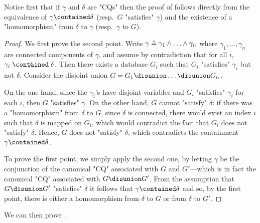 Notice first that if $\gamma$ and $\delta$ are "CQs" then the proof of
 follows directly from the equivalence of $\gamma \contained \delta$ (resp.\ $G$ "satisfies" $\gamma$) and the existence of a "homomorphism" from $\delta$ to $\gamma$ (resp.\ $\gamma$ to $G$).

\begin{proof}
	We first prove the second point.
    Write $\gamma \mathrel{\hat{=}} \gamma_1 \land \hdots \land \gamma_n$ where $\gamma_1,\hdots,\gamma_n$
    are connected components of $\gamma$, and assume by contradiction that
    for all $i$, $\gamma_i \centernot{\contained} \delta$. Then there exists a database $G_i$
    such that $G_i$ "satisfies" $\gamma_i$ but not $\delta$.
    Consider the disjoint union $G = G_1 \disunion \hdots \disunion G_n$.

    On the one hand, since the $\gamma_i$'s have disjoint variables
    and $G_i$ "satisfies" $\gamma_i$ for each $i$, then $G$ "satisfies" $\gamma$.
    On the other hand, $G$ cannot "satisfy" $\delta$:
    if there was a "homomorphism" from $\delta$ to $G$,
    since $\delta$ is connected, there would exist an index $i$
    such that $\delta$ is mapped on $G_i$, which would contradict the
    fact that $G_i$ does not "satisfy" $\delta$.
    Hence, $G$ does not "satisfy" $\delta$, which contradicts the containment
    $\gamma \contained \delta$.

	To prove the first point, we simply apply the second one, by letting $\gamma$
	be the conjunction of the canonical "CQ" associated with $G$ and $G'$---which
	is in fact the canonical "CQ" associated with $G\disunion G'$. From the assumption
    that $G \disunion G'$ "satisfies" $\delta$ it follows that $\gamma \contained \delta$
    and so, by the first point, there is either a homomorphism from $\delta$
    to $G$ or from $\delta$ to $G'$.
\end{proof}

We can then prove .

